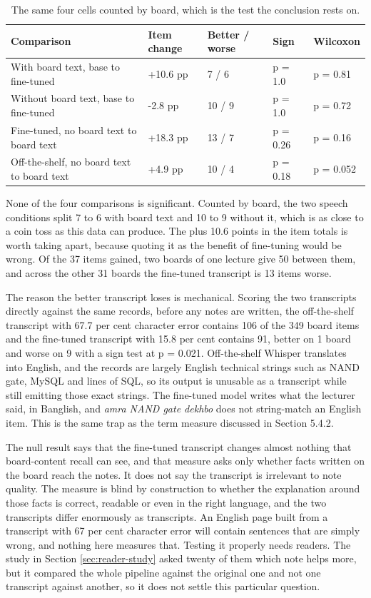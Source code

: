 \begin{table}[htbp]
\centering
\caption{The same four cells counted by board, which is the test the conclusion rests on.}
\label{tab:2x2boards}
\small
\begin{tabular}{p{5.6cm}p{2.2cm}p{2.6cm}p{1.6cm}p{1.6cm}}
\toprule
Comparison & Item change & Better / worse & Sign & Wilcoxon \\
\midrule
With board text, base to fine-tuned & +10.6 pp & 7 / 6 & p = 1.0 & p = 0.81 \\
Without board text, base to fine-tuned & -2.8 pp & 10 / 9 & p = 1.0 & p = 0.72 \\
Fine-tuned, no board text to board text & +18.3 pp & 13 / 7 & p = 0.26 & p = 0.16 \\
Off-the-shelf, no board text to board text & +4.9 pp & 10 / 4 & p = 0.18 & p = 0.052 \\
\bottomrule
\end{tabular}
\end{table}

None of the four comparisons is significant. Counted by board, the two speech conditions
split 7 to 6 with board text and 10 to 9 without it, which is as close to a coin toss as
this data can produce. The plus 10.6 points in the item totals is worth taking apart,
because quoting it as the benefit of fine-tuning would be wrong. Of the 37 items gained,
two boards of one lecture give 50 between them, and across the other 31 boards the
fine-tuned transcript is 13 items worse.

The reason the better transcript loses is mechanical. Scoring the two transcripts directly
against the same records, before any notes are written, the off-the-shelf transcript with
67.7 per cent character error contains 106 of the 349 board items and the fine-tuned
transcript with 15.8 per cent contains 91, better on 1 board and worse on 9 with a sign
test at p = 0.021. Off-the-shelf Whisper translates into English, and the records are
largely English technical strings such as NAND gate, MySQL and lines of SQL, so its output
is unusable as a transcript while still emitting those exact strings. The fine-tuned model
writes what the lecturer said, in Banglish, and \textit{amra NAND gate dekhbo} does not
string-match an English item. This is the same trap as the term measure discussed in
Section 5.4.2.

The null result says that the fine-tuned transcript changes almost nothing that
board-content recall can see, and that measure asks only whether facts written on the
board reach the notes. It does not say the transcript is irrelevant to note quality. The
measure is blind by construction to whether the explanation around those facts is correct,
readable or even in the right language, and the two transcripts differ enormously as
transcripts. An English page built from a transcript with 67 per cent character error will
contain sentences that are simply wrong, and nothing here measures that. Testing it
properly needs readers. The study in Section \ref{sec:reader-study} asked twenty of them
which note helps more, but it compared the whole pipeline against the original one and
not one transcript against another, so it does not settle this particular question.


